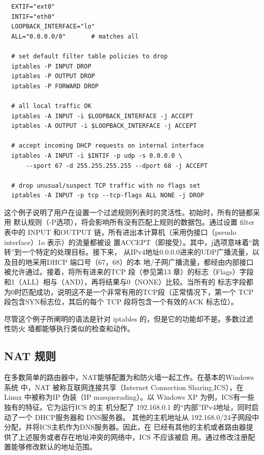 \begin{verbatim}
  EXTIF="ext0"
  INTIF="eth0"
  LOOPBACK_INTERFACE="lo"
  ALL="0.0.0.0/0"       # matches all

  # set default filter table policies to drop
  iptables -P INPUT DROP
  iptables -P OUTPUT DROP
  iptables -P FORWARD DROP

  # all local traffic OK
  iptables -A INPUT -i $LOOPBACK_INTERFACE -j ACCEPT
  iptables -A OUTPUT -i $LOOPBACK_INTERFACE -j ACCEPT

  # accept incoming DHCP requests on internal interface
  iptables -A INPUT -i $INTIF -p udp -s 0.0.0.0 \
      --sport 67 -d 255.255.255.255 --dport 68 -j ACCEPT

  # drop unusual/suspect TCP traffic with no flags set
  iptables -A INPUT -p tcp --tcp-flags ALL NONE -j DROP
\end{verbatim}

这个例子说明了用户在设置一个过滤规则列表时的灵活性。初始时，所有的链都采用
默认规则（-P选项），将会影响所有没有匹配上规则的数据包。通过设置 filter 表中的 INPUT
和OUTPUT 链，所有进出本计算机（采用伪接口（pseudo interface）1o 表示）的流量都被设
置ACCEPT（即接受）。其中，j选项意味着“跳转”到一个特定的处理目标。接下来，
从IPv4地址0.0.0.0进来的UDP广播流量，以及目的地采用DHCP 端口号（67，68）的本
地/子网广播流量，都经由内部接口被允许通过。接着，将所有进来的TCP 段（参见第13
章）的标志（Flags）字段和1（ALL）相与（AND），再将结果与0（NONE）比较。当所有的
标志字段都为0时匹配成功，说明这不是一个非常有用的TCP段（正常情况下，第一个 TCP
段包含SYN标志位，其后的每个 TCP 段将包含一个有效的ACK 标志位）。

尽管这个例子所阐明的语法是针对 iptables 的，但是它的功能却不是。多数过滤性防火
墙都能够执行类似的检查和动作。

\subsection{NAT 规则}

在多数简单的路由器中，NAT能够配置为和防火墙一起工作。在基本的Windows 系统
中，NAT 被称互联网连接共享（Internet Connection Sharing,ICS），在 Linux 中被称为IP
伪装（IP masquerading）。以 Windows XP 为例，ICS有一些独有的特征。它为运行ICS 的主
机分配了 192.168.0.1 的“内部”IPv4地址，同时启动了一个 DHCP服务器和 DNS服务器。
其他的主机地址从 192.168.0/24子网段中分配，并将ICS主机作为DNS服务器。因此，在
已经有其他的主机或者路由器提供了上述服务或者存在地址冲突的网络中，ICS 不应该被启
用。通过修改注册配置能够修改默认的地址范围。

